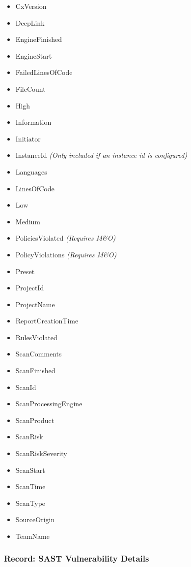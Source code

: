 \begin{itemize}
    \item CxVersion
    \item DeepLink
    \item EngineFinished
    \item EngineStart
    \item FailedLinesOfCode
    \item FileCount
    \item High
    \item Information
    \item Initiator
    \item InstanceId \textit{(Only included if an instance id is configured)}
    \item Languages
    \item LinesOfCode
    \item Low
    \item Medium
    \item PoliciesViolated \textit{(Requires M\&O)}
    \item PolicyViolations \textit{(Requires M\&O)}
    \item Preset
    \item ProjectId
    \item ProjectName
    \item ReportCreationTime
    \item RulesViolated
    \item ScanComments
    \item ScanFinished
    \item ScanId
    \item ScanProcessingEngine
    \item ScanProduct
    \item ScanRisk
    \item ScanRiskSeverity
    \item ScanStart
    \item ScanTime
    \item ScanType
    \item SourceOrigin
    \item TeamName
\end{itemize}


\subsubsection{Record: SAST Vulnerability Details}

